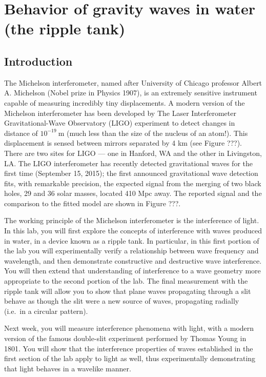 \chapter{Behavior of gravity waves in water (the ripple tank)}

\section{Introduction}

The Michelson interferometer, named after University of Chicago professor Albert A. Michelson (Nobel prize in Physics 1907), is an extremely sensitive instrument capable of measuring incredibly tiny displacements.
A modern version of the Michelson interferometer has been developed by The Laser Interferometer Gravitational-Wave Observatory (LIGO) experiment to detect changes in distance of $10^{-19}\:$m (much less than the size of the nucleus of an atom!).
This displacement is sensed between mirrors separated by 4 km (see Figure ???). There are two sites for LIGO --- one in Hanford, WA and the other in Livingston, LA.
The LIGO interferometer has recently detected gravitational waves for the first time (September 15, 2015); the first announced gravitational wave detection fits, with remarkable precision, the expected signal from the merging of two black holes, 29 and 36 solar masses, located 410 Mpc away.
The reported signal and the comparison to the fitted model are shown in Figure ???.

The working principle of the Michelson interferometer is the interference of light.
In this lab, you will first explore the concepts of interference with waves produced in water, in a device known as a ripple tank.
In particular, in this first portion of the lab you will experimentally verify a relationship between wave frequency and wavelength, and then demonstrate constructive and destructive wave interference.
You will then extend that understanding of interference to a wave geometry more appropriate to the second portion of the lab.
The final measurement with the ripple tank will allow you to show that plane waves propagating through a slit behave as though the slit were a new source of waves, propagating radially (i.e.\ in a circular pattern).

Next week, you will measure interference phenomena with light, with a modern version of the famous double-slit experiment performed by Thomas Young in 1801.
You will show that the interference properties of waves established in the first section of the lab apply to light as well, thus experimentally demonstrating that light behaves in a wavelike manner.

